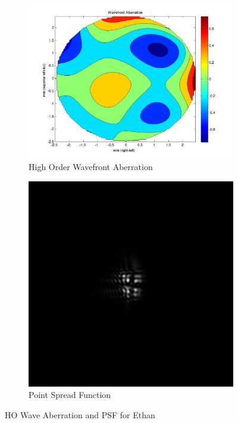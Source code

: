 \documentclass{article}
\begin{document}
\clearpage

\begin{figure}[H]
\begin{subfigure}{.5\textwidth}
  \centering
  \includegraphics[width=1\linewidth]{Ethan_WFA.png}
  \caption{High Order Wavefront Aberration}
  \label{fig:ethanhowa}
\end{subfigure}%
\begin{subfigure}{.5\textwidth}
  \centering
  \includegraphics[width=.8\linewidth]{Ethan_PSF.png}
  \caption{Point Spread Function}
  \label{fig:ethanpsf}
\end{subfigure}
\caption{HO Wave Aberration and PSF for Ethan}
\label{fig:ethan}
\end{figure}
\end{document}
